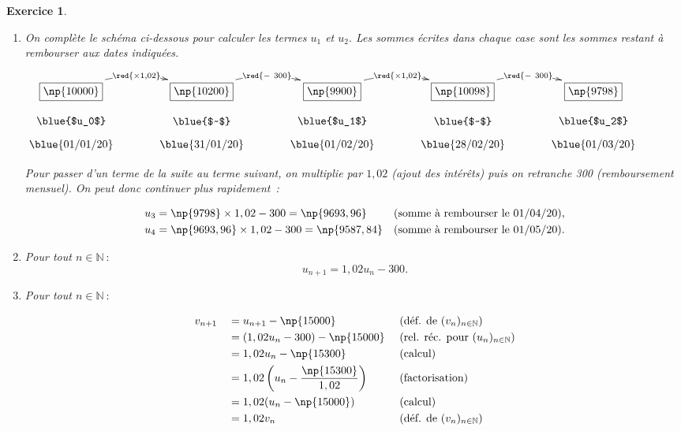 \documentclass[10pt]{article}
\newtheorem{exo}{Exercice}
\begin{document}
\begin{exo}




\begin{enumerate}
\item On complète le schéma ci-dessous pour calculer les termes $u_1$ et $u_2.$ Les sommes écrites dans chaque case sont les sommes restant à rembourser aux dates indiquées.

\medskip

\begin{center}
    $\xymatrix@R=0.5pc@C=3pc{
    *+[F]+{\np{10000}} \ar@/^0.5cm/[r]|{\red{\times 1,02}} & 
    *+[F]+{\np{10200}} \ar@/^0.5cm/[r]|{\red{-~300}} & *+[F]+{\np{9900}}\ar@/^0.5cm/[r]|{\red{\times 1,02}} & *+[F]+{\np{10098}}\ar@/^0.5cm/[r]|{\red{-~300}} & *+[F]+{\np{9798}} \\
    \txt{\blue{$u_0$}}&\txt{\blue{$~$}}&
    \txt{\blue{$u_1$}}&\txt{\blue{$~$}}&\txt{\blue{$u_2$}}\\
    \txt{\blue{01/01/20}}&
    \txt{\blue{31/01/20}}&\txt{\blue{01/02/20}}&
    \txt{\blue{28/02/20}}&\txt{\blue{01/03/20}}
    }$
    \end{center}

Pour passer d'un terme de la suite au terme suivant, on multiplie par $1,02$ (ajout des intérêts) puis on retranche 300 (remboursement mensuel). On peut donc continuer plus rapidement~:

\begin{align*}
u_3&=\np{9798}\times 1,02-300=\np{9693,96}&&\text{(somme à rembourser le 01/04/20)},\\
u_4&=\np{9693,96}\times 1,02-300=\np{9587,84}&&\text{(somme à rembourser le 01/05/20)}
.\end{align*}

\item Pour tout $n\in\mathbb{N}~:$ \[u_{n+1}=1,02u_n-300.\]
\item Pour tout $n\in\mathbb{N}~:$



\begin{alignat*}{3}
&v_{n+1}&& =u_{n+1}-\np{15000} && \text{  (déf. de } (v_n)_{n\in\mathbb{N}})\\
& && =(1,02u_n-300)-\np{15000} && \text{  (rel. réc. pour } (u_n)_{n\in\mathbb{N}})\\
& && =1,02 u_n-\np{15300} && \text{  (calcul)}\\
& && =1,02\left(u_n-\frac{\np{15300}}{1,02}\right) && \text{  (factorisation)}\\
& && =1,02(u_n-\np{15000}) && \text{  (calcul)}\\
& && =1,02v_n&& \text{  (déf. de } (v_n)_{n\in\mathbb{N}})\\
\end{alignat*}



\end{enumerate}
\end{exo}
\end{document}
